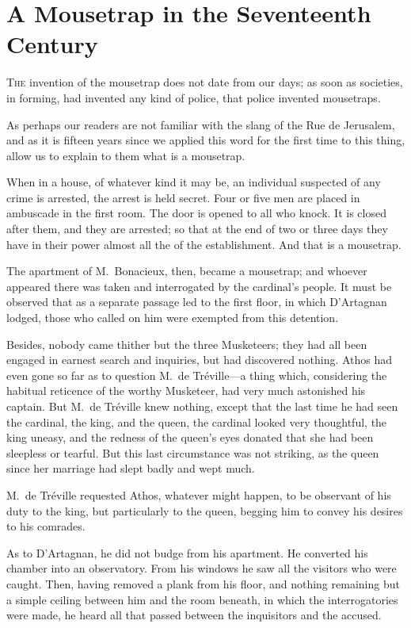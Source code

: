 
\chapter{A Mousetrap in the Seventeenth Century}

\lettrine{T}{he} invention of the mousetrap does not date from our days; as soon as societies, in forming, had invented any kind of police, that police invented mousetraps. 

\zz
As perhaps our readers are not familiar with the slang of the Rue de Jerusalem, and as it is fifteen years since we applied this word for the first time to this thing, allow us to explain to them what is a mousetrap. 

When in a house, of whatever kind it may be, an individual suspected of any crime is arrested, the arrest is held secret. Four or five men are placed in ambuscade in the first room. The door is opened to all who knock. It is closed after them, and they are arrested; so that at the end of two or three days they have in their power almost all the  of the establishment. And that is a mousetrap. 

The apartment of M.~Bonacieux, then, became a mousetrap; and whoever appeared there was taken and interrogated by the cardinal's people. It must be observed that as a separate passage led to the first floor, in which D'Artagnan lodged, those who called on him were exempted from this detention. 

Besides, nobody came thither but the three Musketeers; they had all been engaged in earnest search and inquiries, but had discovered nothing. Athos had even gone so far as to question M.~de Tréville—a thing which, considering the habitual reticence of the worthy Musketeer, had very much astonished his captain. But M.~de Tréville knew nothing, except that the last time he had seen the cardinal, the king, and the queen, the cardinal looked very thoughtful, the king uneasy, and the redness of the queen's eyes donated that she had been sleepless or tearful. But this last circumstance was not striking, as the queen since her marriage had slept badly and wept much. 

M.~de Tréville requested Athos, whatever might happen, to be observant of his duty to the king, but particularly to the queen, begging him to convey his desires to his comrades. 

As to D'Artagnan, he did not budge from his apartment. He converted his chamber into an observatory. From his windows he saw all the visitors who were caught. Then, having removed a plank from his floor, and nothing remaining but a simple ceiling between him and the room beneath, in which the interrogatories were made, he heard all that passed between the inquisitors and the accused. 

